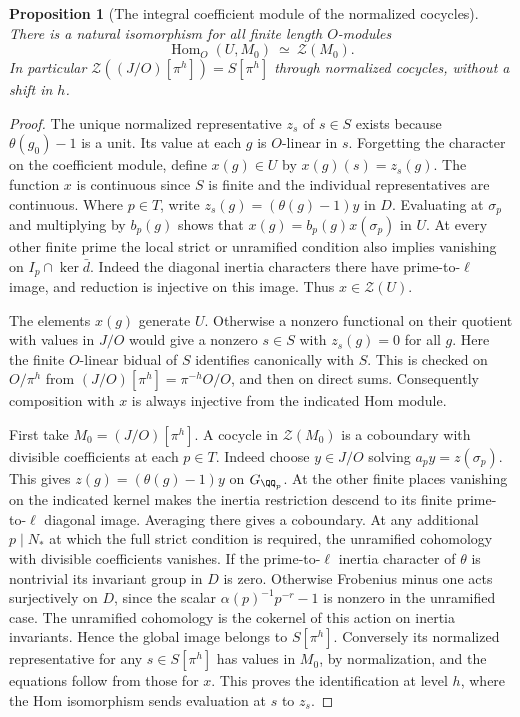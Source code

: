 \documentclass[a4paper,11pt]{article}
\newtheorem{proposition}{Proposition}[section]
\theoremstyle{definition}
\theoremstyle{remark}
\numberwithin{equation}{section}
\begin{document}
\begin{proposition}[The integral coefficient module of the normalized cocycles]\leavevmode
\label{prop:strictrootmodule434}
There is a natural isomorphism for all finite length \(O\)-modules
\[
               \operatorname{Hom}_O(U,M_0)
                        \ \simeq\ \mathcal Z(M_0).
\]
In particular \(\mathcal Z((J/O)[\pi^h])=S[\pi^h]\) through
normalized cocycles, without a shift in \(h\).
\end{proposition}
\begin{proof}
The unique normalized representative \(z_s\) of \(s\in S\)
exists because \(\theta(g_0)-1\) is a unit. Its value at
each \(g\) is \(O\)-linear in \(s\). Forgetting the character
on the coefficient module, define \(x(g)\in U\) by
\(x(g)(s)=z_s(g)\). The function \(x\) is continuous since
\(S\) is finite and the individual representatives are
continuous. Where \(p\in T\), write \(z_s(g)=(\theta(g)-1)y\)
in \(D\). Evaluating at \(\sigma_p\) and multiplying by
\(b_p(g)\) shows that \(x(g)=b_p(g)x(\sigma_p)\) in \(U\).
At every other finite prime the local strict or unramified
condition also implies vanishing on \(I_p\cap\ker\bar d\).
Indeed the diagonal inertia characters there have prime-to-\(\ell\)
image, and reduction is injective on this image.
Thus \(x\in\mathcal Z(U)\).

The elements \(x(g)\) generate \(U\). Otherwise a nonzero
functional on their quotient with values in \(J/O\) would
give a nonzero \(s\in S\) with \(z_s(g)=0\) for all \(g\).
Here the finite \(O\)-linear bidual of \(S\) identifies
canonically with \(S\). This is checked on \(O/\pi^h\)
from \((J/O)[\pi^h]=\pi^{-h}O/O\), and then on direct sums.
Consequently composition with \(x\) is always injective
from the indicated Hom module.

First take \(M_0=(J/O)[\pi^h]\). A cocycle in
\(\mathcal Z(M_0)\) is a coboundary with divisible
coefficients at each \(p\in T\). Indeed choose
\(y\in J/O\) solving \(a_py=z(\sigma_p)\). This gives
\(z(g)=(\theta(g)-1)y\) on \(G_{\QQ_p}\). At the other
finite places vanishing on the indicated kernel makes the
inertia restriction descend to its finite prime-to-\(\ell\)
diagonal image. Averaging there gives a coboundary. At any
additional \(p\mid N_*\) at which the full strict condition
is required, the unramified cohomology with divisible
coefficients vanishes. If the prime-to-\(\ell\) inertia
character of \(\theta\) is nontrivial its invariant group
in \(D\) is zero. Otherwise Frobenius minus one acts
surjectively on \(D\), since the scalar
\(\alpha(p)^{-1}p^{-r}-1\) is nonzero in the unramified
case. The unramified cohomology is the cokernel of this action
on inertia invariants. Hence the global image belongs to
\(S[\pi^h]\). Conversely its normalized representative for
any \(s\in S[\pi^h]\) has values in \(M_0\), by normalization,
and the equations follow from those for \(x\). This proves the
identification at level \(h\), where the Hom isomorphism sends
evaluation at \(s\) to \(z_s\).


\end{proof}
\end{document}
